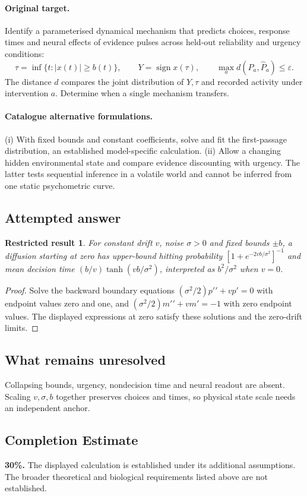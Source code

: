 \documentclass[11pt]{article}
\newtheorem{attemptresult}{Restricted result}[section]
\begin{document}
\paragraph{Original target.}
Identify a parameterised dynamical mechanism that predicts choices, response times and neural effects of evidence pulses across held-out reliability and urgency conditions:
\[
\tau=\inf\{t:|x(t)|\geq b(t)\},\qquad
Y=\operatorname{sign}x(\tau),\qquad
\max_a d(P_a,\widehat P_a)\leq\varepsilon.
\]
The distance $d$ compares the joint distribution of $Y,\tau$ and recorded activity under intervention $a$. Determine when a single mechanism transfers.
\paragraph{Catalogue alternative formulations.}
(i) With fixed bounds and constant coefficients, solve and fit the first-passage distribution, an established model-specific calculation. (ii) Allow a changing hidden environmental state and compare evidence discounting with urgency. The latter tests sequential inference in a volatile world and cannot be inferred from one static psychometric curve.
\subsection{Attempted answer}
\begin{attemptresult}
For constant drift $v$, noise $\sigma>0$ and fixed bounds $\pm b$, a diffusion starting at zero has upper-bound hitting probability $[1+e^{-2vb/\sigma^2}]^{-1}$ and mean decision time $(b/v)\tanh(vb/\sigma^2)$, interpreted as $b^2/\sigma^2$ when $v=0$.
\end{attemptresult}
\begin{proof}
Solve the backward boundary equations $(\sigma^2/2)p\prime\prime+vp\prime=0$ with endpoint values zero and one, and $(\sigma^2/2)m\prime\prime+vm\prime=-1$ with zero endpoint values. The displayed expressions at zero satisfy these solutions and the zero-drift limits.
\end{proof}
\subsection{What remains unresolved}
Collapsing bounds, urgency, nondecision time and neural readout are absent. Scaling $v,\sigma,b$ together preserves choices and times, so physical state scale needs an independent anchor.
\subsection{Completion Estimate}
\textbf{30\%.} The displayed calculation is established under its additional assumptions. The broader theoretical and biological requirements listed above are not established.
\end{document}
